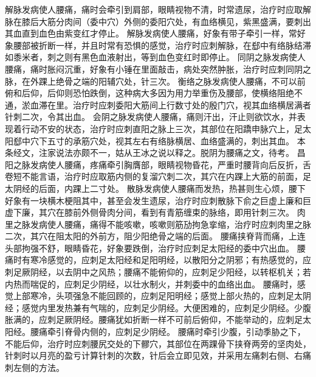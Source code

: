 \documentclass[a4paper,12pt,UTF8,twoside]{ctexbook}
\begin{document}
解脉发病使人腰痛，痛时会牵引到肩部，眼睛视物不清，时常遗尿，治疗时应取解脉在膝后大筋分肉间（委中穴）外侧的委阳穴处，有血络横见，紫黑盛满，要刺出其血直到血色由紫变红才停止。
解脉发病使人腰痛，好象有带子牵引一样，常好象腰部被折断一样，并且时常有恐惧的感觉，治疗时应刺解脉，在郄中有络脉结滞如黍米者，刺之则有黑色血液射出，等到血色变红时即停止。
同阴之脉发病使人腰痛，痛时胀闷沉重，好象有小锤在里面敲击，病处突然肿胀，治疗时应刺同阴之脉，在外踝上绝骨之端的阳辅穴处，针三次。
衡络之脉发病使人腰痛，不可以前俯和后仰，后仰则恐怕跌倒，这种病大多因为用力举重伤及腰部，使横络阻绝不通，淤血滞在里。治疗时应刺委阳大筋间上行数寸处的殷门穴，视其血络横居满者针刺二次，令其出血。
会阴之脉发病使人腰痛，痛则汗出，汗止则欲饮水，并表现着行动不安的状态，治疗时应刺直阳之脉上三次，其部位在阳蹻申脉穴上，足太阳郄中穴下五寸的承筋穴处，视其左右有络脉横居、血络盛满的，刺出其血。
本条经文，注家说法亦颇不一，姑从王冰之说以释之。脱阴为腰痛之文，待考。
昌阳之脉发病使人腰痛，疼痛牵引胸膺部，眼睛视物昏花，严重时腰背向后反折，舌卷短不能言语，治疗时应取筋内侧的复溜穴刺二次，其穴在内踝上大筋的前面，足太阴经的后面，内踝上二寸处。
散脉发病使人腰痛而发热，热甚则生心烦，腰下好象有一块横木梗阻其中，甚至会发生遗尿，治疗时应刺散脉下俞之巨虚上廉和巨虚下廉，其穴在膝前外侧骨肉分间，看到有青筋缠束的脉络，即用针刺三次。
肉里之脉发病使人腰痛，痛得不能咳嗽，咳嗽则筋劢拘急挛缩，治疗时应刺肉里之脉二次，其穴在阻太阳的外前方，阻少阳绝骨之端的后面。
腰痛挟脊背而痛，上连头部拘强不舒，眼睛昏花，好象要跌倒，治疗时应刺足太阳经的委中穴出血。
腰痛时有寒冷感觉的，应刺足太阳经和足阳明经，以散阳分之阴邪；有热感觉的，应刺足厥阴经，以去阴中之风热；腰痛不能俯仰的，应刺足少阳经，以转枢机关；若内热而喘促的，应刺足少阴经，以壮水制火，并刺委中的血络出血。
腰痛时，感觉上部寒冷，头项强急不能回顾的，应刺足阳明经；感觉上部火热的，应刺足太阴经；感觉内里发热兼有气喘的，应刺足少阴经。大便困难的，应刺足少阴经。少腹胀满的，应刺足厥阴经。腰痛犹如折断一样不可前后俯仰，不能举动的，应刺足太阳经。腰痛牵引脊骨内侧的，应刺足少阴经。
腰痛时牵引少腹，引动季胁之下，不能后仰，治疗时应刺腰尻交处的下髎穴，其部位在两踝骨下挟脊两旁的坚肉处，针刺时以月亮的盈亏计算针刺的次数，针后会立即见效，并采用左痛刺右侧、右痛刺左侧的方法。

\part{}
\end{document}
